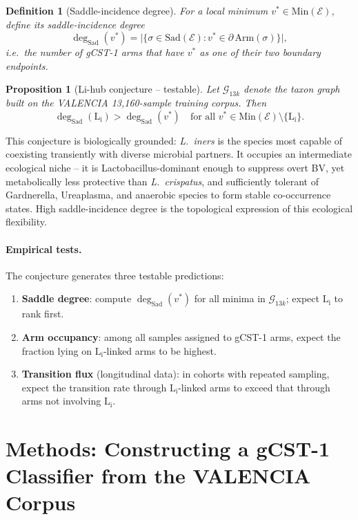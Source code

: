 \documentclass[11pt]{article}
\theoremstyle{plain}
\newtheorem{definition}{Definition}[section]
\newtheorem{proposition}{Proposition}[section]
\newcommand{\E}{\mathcal{E}}
\newcommand{\G}{\mathcal{G}}
\newcommand{\Min}{\mathrm{Min}}
\newcommand{\Sad}{\mathrm{Sad}}
\newcommand{\Li}{\mathrm{L}_\mathrm{i}}
\begin{document}
\begin{definition}[Saddle-incidence degree]
  For a local minimum $v^* \in \Min(\E)$, define its \emph{saddle-incidence
  degree}
  \[
    \deg_\Sad(v^*) =
      \bigl|\{\sigma \in \Sad(\E) :
        v^* \in \partial\,\mathrm{Arm}(\sigma)\}\bigr|,
  \]
  i.e.\ the number of gCST-1 arms that have $v^*$ as one of their two
  boundary endpoints.
\end{definition}

\begin{proposition}[Li-hub conjecture -- testable]
  Let $\G_{13k}$ denote the taxon graph built on the VALENCIA 13{,}160-sample
  training corpus.  Then
  \[
    \deg_\Sad(\Li) > \deg_\Sad(v^*)
    \quad \text{for all } v^* \in \Min(\E) \setminus \{\Li\}.
  \]
\end{proposition}

This conjecture is biologically grounded: \textit{L.\ iners} is the species
most capable of coexisting transiently with diverse microbial partners.  It
occupies an intermediate ecological niche -- it is Lactobacillus-dominant
enough to suppress overt BV, yet metabolically less protective than
\textit{L.\ crispatus}, and sufficiently tolerant of Gardnerella, Ureaplasma,
and anaerobic species to form stable co-occurrence states.  High
saddle-incidence degree is the topological expression of this ecological
flexibility.

\paragraph{Empirical tests.}
The conjecture generates three testable predictions:
\begin{enumerate}[noitemsep]
  \item \textbf{Saddle degree}: compute $\deg_\Sad(v^*)$ for all minima in
        $\G_{13k}$; expect $\Li$ to rank first.
  \item \textbf{Arm occupancy}: among all samples assigned to gCST-1 arms,
        expect the fraction lying on $\Li$-linked arms to be highest.
  \item \textbf{Transition flux} (longitudinal data): in cohorts with
        repeated sampling, expect the transition rate through $\Li$-linked
        arms to exceed that through arms not involving $\Li$.
\end{enumerate}

\section{Methods: Constructing a gCST-1 Classifier from the VALENCIA Corpus}
\label{sec:implementation}
\end{document}
